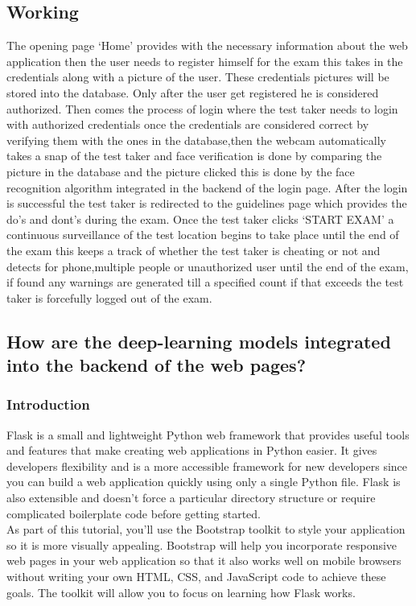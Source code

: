 \documentclass[12pt]{report}
\begin{document}
\subsection{Working}
The opening page ‘Home’ provides with the necessary information about the web application then the user needs to register himself for the exam this takes in the credentials along with a picture of the user. These credentials pictures will be stored into the database. Only after the user get registered he is considered authorized. Then comes the process of login where the test taker needs to login with authorized credentials once the credentials are considered correct by verifying them with the ones in the database,then the webcam automatically takes a snap of the test taker and face verification is done by comparing the picture in the database and the picture clicked this is done by the face recognition algorithm integrated in the backend of the login page. After the login is successful the test taker is redirected to the guidelines page which provides the do’s and dont’s during the exam. Once the test taker clicks ‘START EXAM’ a continuous surveillance of the test location begins to take place until the end of the exam this keeps a track of whether the test taker is cheating or not and detects for phone,multiple people or unauthorized user until the end of the exam, if found any warnings are generated till a specified count if that exceeds the test taker is forcefully logged out of the exam.
\\
\subsection{How are the deep-learning models integrated into the backend of the web pages?}
\subsubsection{Introduction}
Flask is a small and lightweight Python web framework that provides useful tools and features that make creating web applications in Python easier. It gives developers flexibility and is a more accessible framework for new developers since you can build a web application quickly using only a single Python file. Flask is also extensible and doesn’t force a particular directory structure or require complicated boilerplate code before getting started.\\
As part of this tutorial, you’ll use the Bootstrap toolkit to style your application so it is more visually appealing. Bootstrap will help you incorporate responsive web pages in your web application so that it also works well on mobile browsers without writing your own HTML, CSS, and JavaScript code to achieve these goals. The toolkit will allow you to focus on learning how Flask works.\\
\end{document}
